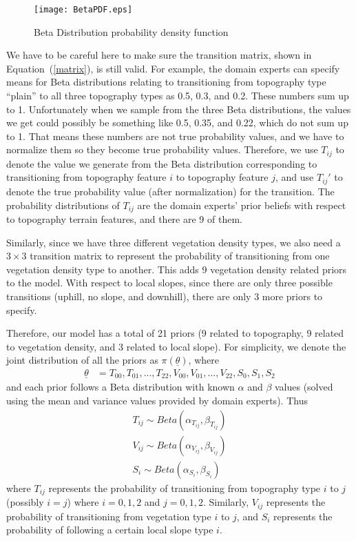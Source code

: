 \documentclass[smallextended,natbib]{svjour3}
\begin{document}
\begin{figure}
\centering
\texttt{[image: BetaPDF.eps]}
\caption[Beta Distribution probability density function]{Beta Distribution probability density function}
\label{BetaPDF}
\end{figure}

We have to be careful here to make sure the transition matrix, shown in Equation~(\ref{matrix}), is still valid. For example, the domain experts can specify means for Beta distributions relating to transitioning from topography type ``plain'' to all three topography types as 0.5, 0.3, and 0.2. These numbers sum up to 1. Unfortunately when we sample from the three Beta distributions, the values we get could possibly be something like 0.5, 0.35, and 0.22, which do not sum up to 1. That means these numbers are not true probability values, and we have to normalize them so they become true probability values. Therefore, we use $T_{ij}$ to denote the value we generate from the Beta distribution corresponding to transitioning from topography feature $i$ to topography feature $j$, and use $T_{ij}'$ to denote the true probability value (after normalization) for the transition. The probability distributions of $T_{ij}$ are the domain experts' prior beliefs with respect to topography terrain features, and there are 9 of them.

Similarly, since we have three different vegetation density types, we also need a $3 \times 3$ transition matrix to represent the probability of transitioning from one vegetation density type to another. This adds 9 vegetation density related priors to the model. With respect to local slopes, since there are only three possible transitions (uphill, no slope, and downhill), there are only 3 more priors to specify.

Therefore, our model has a total of 21 priors (9 related to topography, 9 related to vegetation density, and 3 related to local slope). For simplicity, we denote the joint distribution of all the priors as $\pi(\underline{\theta})$, where 
\begin{align}
\label{21}
\underline{\theta} &=T_{00},T_{01},...,T_{22},V_{00},V_{01},...,V_{22},S_0,S_1,S_2
\end{align}
and each prior follows a Beta distribution with known $\alpha$ and $\beta$ values (solved using the mean and variance values provided by domain experts). Thus
\begin{align}
\label{BetaT}
T_{ij} \sim Beta(\alpha_{T_{ij}}, \beta_{T_{ij}})\\
\label{BetaV}
V_{ij} \sim Beta(\alpha_{V_{ij}}, \beta_{V_{ij}})\\
\label{BetaS}
S_{i} \sim Beta(\alpha_{S_{i}}, \beta_{S_{i}})
\end{align}
where $T_{ij}$ represents the probability of transitioning from topography type $i$ to $j$ (possibly $i=j$) where $i=0,1,2$ and $j=0,1,2$. Similarly, $V_{ij}$ represents the probability of transitioning from vegetation type $i$ to $j$, and $S_{i}$ represents the probability of following a certain local slope type $i$.
\end{document}
